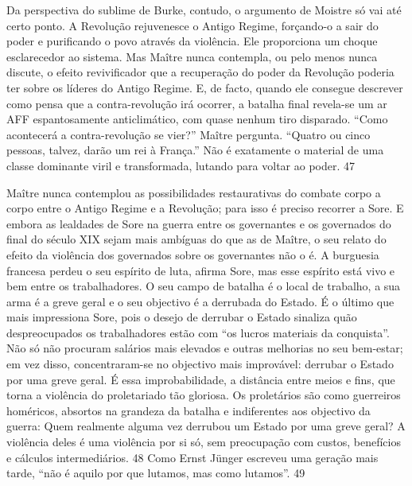  
\par
 
Da perspectiva do sublime de Burke, contudo, o argumento de Moistre só vai até certo ponto. A Revolução rejuvenesce o Antigo Regime, forçando-o a sair do poder e purificando o povo através da violência. Ele proporciona um choque esclarecedor ao sistema. Mas Maître nunca contempla, ou pelo menos nunca discute, o efeito revivificador que a recuperação do poder da Revolução poderia ter sobre os líderes do Antigo Regime. E, de facto, quando ele consegue descrever como pensa que a contra-revolução irá ocorrer, a batalha final revela-se um ar AFF espantosamente anticlimático, com quase nenhum tiro disparado. “Como acontecerá a contra-revolução se vier?” Maître pergunta. “Quatro ou cinco pessoas, talvez, darão um rei à França.” Não é exatamente o material de uma classe dominante viril e transformada, lutando para voltar ao poder.
 {\color{blue} 47}  

 
\par
 
Maître nunca contemplou as possibilidades restaurativas do combate corpo a corpo entre o Antigo Regime e a Revolução; para isso é preciso recorrer a Sore. E embora as lealdades de Sore na guerra entre os governantes e os governados do final do século XIX sejam mais ambíguas do que as de Maître, o seu relato do efeito da violência dos governados sobre os governantes não o é. A burguesia francesa perdeu o seu espírito de luta, afirma Sore, mas esse espírito está vivo e bem entre os trabalhadores. O seu campo de batalha é o local de trabalho, a sua arma é a greve geral e o seu objectivo é a derrubada do Estado. É o último que mais impressiona Sore, pois o desejo de derrubar o Estado sinaliza quão despreocupados os trabalhadores estão com “os lucros materiais da conquista”. Não só não procuram salários mais elevados e outras melhorias no seu bem-estar; em vez disso, concentraram-se no objectivo mais improvável: derrubar o Estado por uma greve geral. É essa improbabilidade, a distância entre meios e fins, que torna a violência do proletariado tão gloriosa. Os proletários são como guerreiros homéricos, absortos na grandeza da batalha e indiferentes aos objectivo da guerra: Quem realmente alguma vez derrubou um Estado por uma greve geral? A violência deles é uma violência por si só, sem preocupação com custos, benefícios e cálculos intermediários.
 {\color{blue} 48}  
Como Ernst Jünger escreveu uma geração mais tarde, “não é aquilo por que lutamos, mas como lutamos”.
 {\color{blue} 49}  

